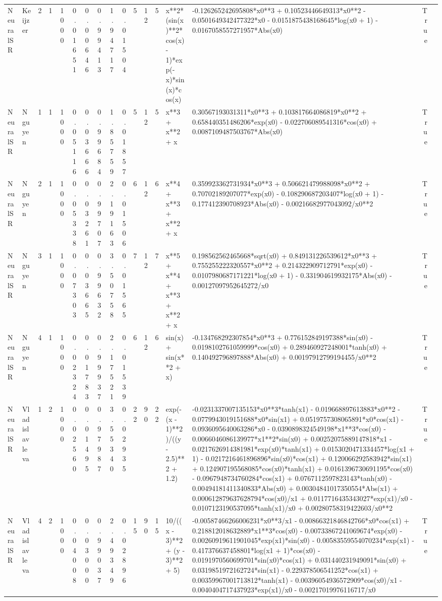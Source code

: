 \begin{tabular}{llrrrrrrrrrrrllrl}
NeuralSR & Keijzer & 2 & 1 & 1000 & 0.01651 & 0.00646 & 0.99413 & 1.94717 & 0.01504 & 5 & 12 & 5 & x**2*(sin(x)**2*cos(x) - 1)*exp(-x)*sin(x)*cos(x) & -0.126265242695808*x0**3 + 0.10523446649313*x0**2 - 0.0501649342477322*x0 - 0.0151875438168645*log(x0 + 1) - 0.0167058557271957*Abs(x0) & True &  \\
NeuralSR & Nguyen & 1 & 1 & 1000 & 0.05116 & 0.03666 & 0.99684 & 1.85759 & 0.01857 & 5 & 12 & 5 & x**3 + x**2 + x & 0.30567193031311*x0**3 + 0.103817664086819*x0**2 + 0.658440351486206*exp(x0) - 0.022706089541316*cos(x0) + 0.0087109487503767*Abs(x0) & True &  \\
NeuralSR & Nguyen & 2 & 1 & 1000 & 0.05338 & 0.03261 & 0.99707 & 2.19163 & 0.01506 & 6 & 12 & 6 & x**4 + x**3 + x**2 + x & 0.359923362731934*x0**3 + 0.506621479988098*x0**2 + 0.70702189207077*exp(x0) - 0.108290687203407*log(x0 + 1) - 0.177412390708923*Abs(x0) - 0.00216682977043092/x0**2 & True &  \\
NeuralSR & Nguyen & 3 & 1 & 1000 & 0.07303 & 0.03665 & 0.99632 & 3.50758 & 0.01565 & 7 & 12 & 7 & x**5 + x**4 + x**3 + x**2 + x & 0.198562562465668*sqrt(x0) + 0.849131226539612*x0**3 + 0.755255222320557*x0**2 + 0.214322909712791*exp(x0) - 0.0107980687171221*log(x0 + 1) - 0.331904619932175*Abs(x0) - 0.00127097952645272/x0 & True &  \\
NeuralSR & Nguyen & 4 & 1 & 1000 & 0.02324 & 0.01783 & 0.99937 & 2.17521 & 0.01539 & 6 & 12 & 6 & sin(x) + sin(x**2 + x) & -0.134768292307854*x0**3 + 0.776152849197388*sin(x0) - 0.0198102761059999*cos(x0) + 0.289460927248001*tanh(x0) + 0.140492796897888*Abs(x0) + 0.00197912799194455/x0**2 & True &  \\
NeuralSR & Vladislavleva & 1 & 2 & 1000 & 0.02560 & 0.01495 & 0.97987 & 3.55340 & 0.02935 & 22 & 90 & 22 & exp(-(x - 1)**2)/((y - 2.5)**2 + 1.2) & -0.0231337007135153*x0**3*tanh(x1) - 0.019668897613883*x0**2 - 0.0779943019151688*x0*sin(x1) + 0.0519757308065891*x0*cos(x1) - 0.0936095640063286*x0 - 0.0390898324549198*x1**3*cos(x0) - 0.0066046086139977*x1**2*sin(x0) + 0.00252075889147818*x1 - 0.0217626914381981*exp(x0)*tanh(x1) + 0.0153020471334457*log(x1 + 1) - 0.0217216461896896*sin(x0)*cos(x1) + 0.120066292583942*sin(x1) + 0.124907195568085*cos(x0)*tanh(x1) + 0.0161396730691195*cos(x0) - 0.0967948734760284*cos(x1) + 0.0767112597823143*tanh(x0) - 0.00494181411340833*Abs(x0) + 0.00304841017350554*Abs(x1) + 0.000612879637628794*cos(x0)/x1 + 0.0117716435343027*exp(x1)/x0 - 0.0107123190537095*tanh(x1)/x0 + 0.00280758319422603/x0**2 & True &  \\
NeuralSR & Vladislavleva & 4 & 2 & 1000 & 0.04008 & 0.03000 & 0.99037 & 2.49349 & 0.02896 & 15 & 90 & 15 & 10/((x - 3)**2 + (y - 3)**2 + 5) & -0.00587466266006231*x0**3/x1 - 0.00866321846842766*x0*cos(x1) + 0.218812018632889*x1**3*cos(x0) - 0.00733867241069674*exp(x0) - 0.00260919611901045*exp(x1)*sin(x0) - 0.00583559554070234*exp(x1) - 0.417376637458801*log(x1 + 1)*cos(x0) - 0.0191970560699701*sin(x0)*cos(x1) + 0.031440231949091*sin(x0) + 0.0319851972162724*sin(x1) - 0.229378506541252*cos(x1) + 0.00359967001713812*tanh(x1) - 0.00396054936572909*cos(x0)/x1 - 0.0040404717437923*exp(x1)/x0 - 0.00217019976116717/x0 & True &  \\

\end{tabular}
